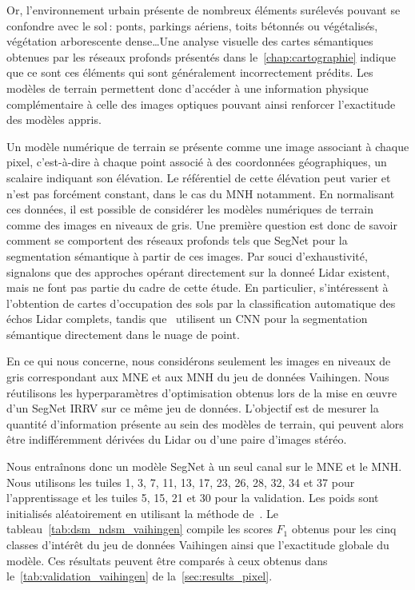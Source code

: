 Or, l'environnement urbain présente de nombreux éléments surélevés pouvant se confondre avec le sol\,: ponts, parkings aériens, toits bétonnés ou végétalisés, végétation arborescente dense\dots Une analyse visuelle des cartes sémantiques obtenues par les réseaux profonds présentés dans le~\cref{chap:cartographie} indique que ce sont ces éléments qui sont généralement incorrectement prédits. Les modèles de terrain permettent donc d'accéder à une information physique complémentaire à celle des images optiques pouvant ainsi renforcer l'exactitude des modèles appris.

Un modèle numérique de terrain se présente comme une image associant à chaque pixel, c'est-à-dire à chaque point associé à des coordonnées géographiques, un scalaire indiquant son élévation. Le référentiel de cette élévation peut varier et n'est pas forcément constant, dans le cas du \gls{MNH} notamment. En normalisant ces données, il est possible de considérer les modèles numériques de terrain comme des images en niveaux de gris. Une première question est donc de savoir comment se comportent des réseaux profonds tels que SegNet pour la segmentation sémantique à partir de ces images. Par souci d'exhaustivité, signalons que des approches opérant directement sur la donneé \gls{Lidar} existent, mais ne font pas partie du cadre de cette étude. En particulier, \citet{yan_urban_2015} s'intéressent à l'obtention de cartes d'occupation des sols par la classification automatique des échos \gls{Lidar} complets, tandis que~\citet{yang_convolutional_2017} utilisent un \gls{CNN} pour la segmentation sémantique directement dans le nuage de point.

En ce qui nous concerne, nous considérons seulement les images en niveaux de gris correspondant aux \gls{MNE} et aux \gls{MNH} du jeu de données  Vaihingen. Nous réutilisons les hyperparamètres d'optimisation obtenus lors de la mise en \oe{}uvre d'un SegNet \gls{IRRV} sur ce même jeu de données. L'objectif est de mesurer la quantité d'information présente au sein des modèles de terrain, qui peuvent alors être indifféremment dérivées du \gls{Lidar} ou d'une paire d'images stéréo.

Nous entraînons donc un modèle SegNet à un seul canal sur le \gls{MNE} et le \gls{MNH}. Nous utilisons les tuiles 1, 3, 7, 11, 13, 17, 23, 26, 28, 32, 34 et 37 pour l'apprentissage et les tuiles 5, 15, 21 et 30 pour la validation. Les poids sont initialisés aléatoirement en utilisant la méthode de~\citet{he_delving_2015}. Le tableau~\cref{tab:dsm_ndsm_vaihingen} compile les scores $F_1$ obtenus pour les cinq classes d'intérêt du jeu de données  Vaihingen ainsi que l'exactitude globale du modèle. Ces résultats peuvent être comparés à ceux obtenus dans le~\cref{tab:validation_vaihingen} de la~\cref{sec:results_pixel}.

